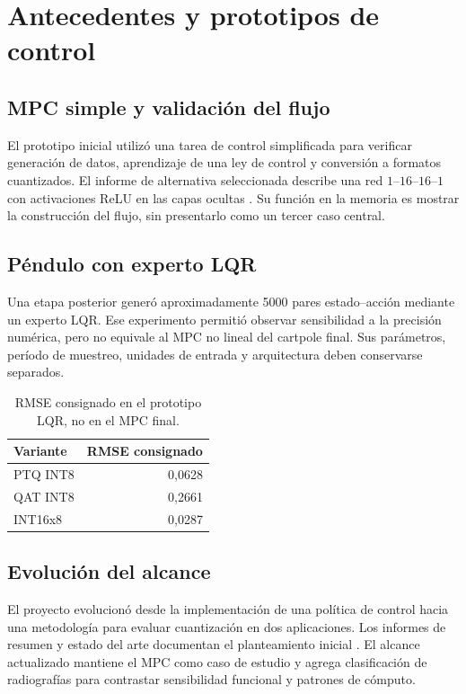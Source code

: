 \chapter{Antecedentes y prototipos de control}
\section{MPC simple y validación del flujo}
El prototipo inicial utilizó una tarea de control simplificada para verificar generación de datos, aprendizaje de una ley de control y conversión a formatos cuantizados. El informe de alternativa seleccionada describe una red $1$--$16$--$16$--$1$ con activaciones ReLU en las capas ocultas \cite{alternativa2026}. Su función en la memoria es mostrar la construcción del flujo, sin presentarlo como un tercer caso central.

\section{Péndulo con experto LQR}
Una etapa posterior generó aproximadamente 5000 pares estado--acción mediante un experto LQR. Ese experimento permitió observar sensibilidad a la precisión numérica, pero no equivale al MPC no lineal del cartpole final. Sus parámetros, período de muestreo, unidades de entrada y arquitectura deben conservarse separados.

\begin{table}[H]\centering\small
\caption{RMSE consignado en el prototipo LQR, no en el MPC final.}
\begin{tabular}{lr}\toprule Variante & RMSE consignado\\\midrule
PTQ INT8 & 0,0628\\
QAT INT8 & 0,2661\\
INT16x8 & 0,0287\\\bottomrule
\end{tabular}
\end{table}

\section{Evolución del alcance}
El proyecto evolucionó desde la implementación de una política de control hacia una metodología para evaluar cuantización en dos aplicaciones. Los informes de resumen y estado del arte documentan el planteamiento inicial \cite{resumen2026,estado2026}. El alcance actualizado mantiene el MPC como caso de estudio y agrega clasificación de radiografías para contrastar sensibilidad funcional y patrones de cómputo.
